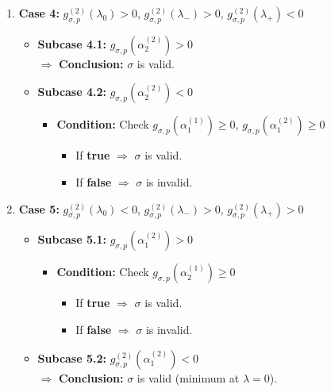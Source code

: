 \documentclass[a4paper, 10pt]{article}
\theoremstyle{definition}
\begin{document}
\begin{enumerate}
    \item \textbf{Case 4:} $g_{\sigma, p}^{(2)}(\lambda_0) > 0$, $g_{\sigma, p}^{(2)}(\lambda_-) > 0$, $g_{\sigma, p}^{(2)}(\lambda_+) < 0$
    \begin{itemize}
        \item \textbf{Subcase 4.1:} $g_{\sigma, p}(\alpha^{(2)}_2) > 0$ \\
        $\Rightarrow$ \textbf{Conclusion:} $\sigma$ is valid.
        \item \textbf{Subcase 4.2:} $g_{\sigma, p}(\alpha^{(2)}_2) < 0$
        \begin{itemize}
            \item \textbf{Condition:} Check $g_{\sigma, p}(\alpha^{(1)}_1) \geq 0$, $g_{\sigma, p}(\alpha^{(2)}_1) \geq 0$
            \begin{itemize}
                \item If \textbf{true} $\Rightarrow$ $\sigma$ is valid.
                \item If \textbf{false} $\Rightarrow$ $\sigma$ is invalid.
            \end{itemize}
        \end{itemize}
    \end{itemize}

    \item \textbf{Case 5:} $g_{\sigma, p}^{(2)}(\lambda_0) < 0$, $g_{\sigma, p}^{(2)}(\lambda_-) > 0$, $g_{\sigma, p}^{(2)}(\lambda_+) > 0$
    \begin{itemize}
        \item \textbf{Subcase 5.1:} $g_{\sigma, p}(\alpha^{(2)}_1) > 0$
        \begin{itemize}
            \item \textbf{Condition:} Check $g_{\sigma, p}(\alpha^{(1)}_2) \geq 0$
            \begin{itemize}
                \item If \textbf{true} $\Rightarrow$ $\sigma$ is valid.
                \item If \textbf{false} $\Rightarrow$ $\sigma$ is invalid.
            \end{itemize}
        \end{itemize}
        \item \textbf{Subcase 5.2:} $g_{\sigma, p}^{(2)}(\alpha^{(2)}_1) < 0$ \\
        $\Rightarrow$ \textbf{Conclusion:} $\sigma$ is valid (minimum at $\lambda = 0$).
    \end{itemize}
\end{enumerate}
\end{document}
